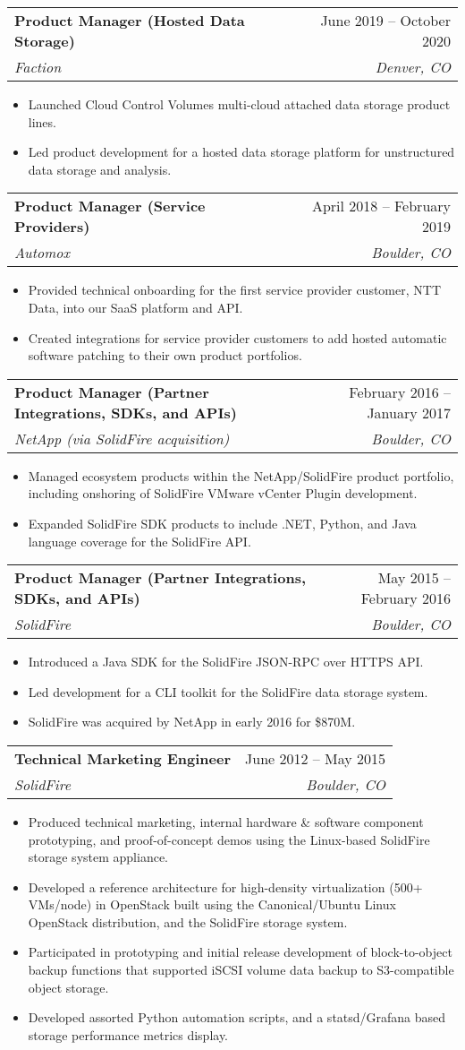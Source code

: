 \documentclass[letterpaper,11pt]{article}
\makeatletter
\newcommand{\resumeItem}[1]{
  \item\footnotesize{
    {#1 \vspace{-2pt}}
  }
}
\newcommand{\resumeSubheading}[4]{
  \vspace{-2pt}\item
    \begin{tabular*}{0.97\textwidth}[t]{l@{\extracolsep{\fill}}r}
      \textbf{\small#1} & \small#2 \\
      \textit{\small#3} & \textit{\small #4} \\
    \end{tabular*}\vspace{-7pt}
}
\newcommand{\resumeItemListStart}{\begin{itemize}}
\newcommand{\resumeItemListEnd}{\end{itemize}\vspace{-5pt}}
\makeatother
\begin{document}
    \resumeSubheading
      {Product Manager (Hosted Data Storage)}{June 2019 -- October 2020}
      {Faction}{Denver, CO}
      \resumeItemListStart
        \resumeItem{Launched Cloud Control Volumes multi-cloud attached data storage product lines.}
        \resumeItem{Led product development for a hosted data storage platform for unstructured data storage and analysis.}
      \resumeItemListEnd

    \resumeSubheading
      {Product Manager (Service Providers)}{April 2018 -- February 2019}
      {Automox}{Boulder, CO}
      \resumeItemListStart
        \resumeItem{Provided technical onboarding for the first service provider customer, NTT Data, into our SaaS platform and API.}
        \resumeItem{Created integrations for service provider customers to add hosted automatic software patching to their own product portfolios.}
      \resumeItemListEnd

    \resumeSubheading
      {Product Manager (Partner Integrations, SDKs, and APIs)}{February 2016 -- January 2017}
      {NetApp (via SolidFire acquisition)}{Boulder, CO}
      \resumeItemListStart
        \resumeItem{Managed ecosystem products within the NetApp/SolidFire product portfolio, including onshoring of SolidFire VMware vCenter Plugin development.}
        \resumeItem{Expanded SolidFire SDK products to include .NET, Python, and Java language coverage for the SolidFire API.}
      \resumeItemListEnd

    \resumeSubheading
      {Product Manager (Partner Integrations, SDKs, and APIs)}{May 2015 -- February 2016}
      {SolidFire}{Boulder, CO}
      \resumeItemListStart
        \resumeItem{Introduced a Java SDK for the SolidFire JSON-RPC over HTTPS API.}
        \resumeItem{Led development for a CLI toolkit for the SolidFire data storage system.}
        \resumeItem{SolidFire was acquired by NetApp in early 2016 for \$870M.}
      \resumeItemListEnd

    \resumeSubheading
      {Technical Marketing Engineer}{June 2012 -- May 2015}
      {SolidFire}{Boulder, CO}
      \resumeItemListStart
        \resumeItem{Produced technical marketing, internal hardware \& software component prototyping, and proof-of-concept demos using the Linux-based SolidFire storage system appliance.}
        \resumeItem{Developed a reference architecture for high-density virtualization (500+ VMs/node) in OpenStack built using the Canonical/Ubuntu Linux OpenStack distribution, and the SolidFire storage system.}
        \resumeItem{Participated in prototyping and initial release development of block-to-object backup functions that supported iSCSI volume data backup to S3-compatible object storage.}
        \resumeItem{Developed assorted Python automation scripts, and a statsd/Grafana based storage performance metrics display.}
      \resumeItemListEnd
\end{document}
